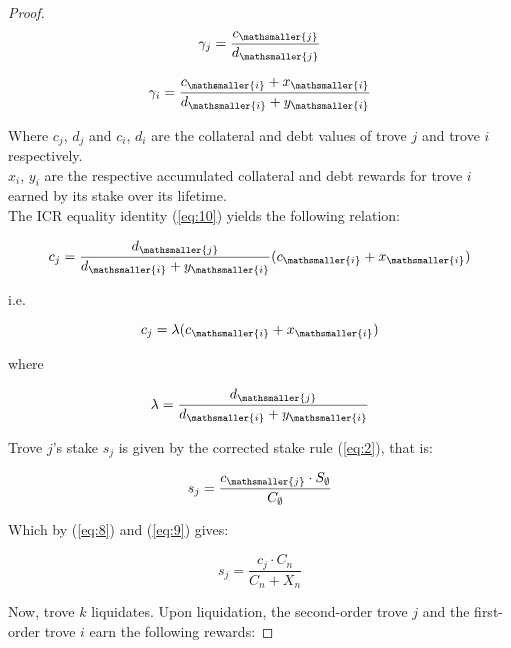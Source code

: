 \documentclass[reqno]{article}
\begin{document}
\begin{proof}
\begin{equation} 
    \gamma_j=\frac{c_\mathsmaller{j}}{d_\mathsmaller{j}}
\end{equation}

\begin{equation} 
    \gamma_i=\frac{c_\mathsmaller{i}+x_\mathsmaller{i}}{d_\mathsmaller{i}+y_\mathsmaller{i}}
\end{equation}

\bigskip
Where $c_j$, $d_j$ and $c_i$, $d_i$ are the collateral and debt values of trove $j$ and trove $i$ respectively.\\

$x_i$, $y_i$ are the respective accumulated collateral and debt rewards for trove $i$ earned by its stake over its lifetime.\\

The ICR equality identity (\ref{eq:10}) yields the following relation:

\begin{equation} 
        c_j=\frac{d_\mathsmaller{j}}{d_\mathsmaller{i}+y_\mathsmaller{i}}(c_\mathsmaller{i}+x_\mathsmaller{i})
\end{equation}

\bigskip
i.e.

\begin{equation} \label{eq:14}
    c_j=\lambda(c_\mathsmaller{i}+x_\mathsmaller{i})
\end{equation}

\bigskip
where

\begin{equation} \label{eq:15}
    \lambda=\frac{d_\mathsmaller{j}}{d_\mathsmaller{i}+y_\mathsmaller{i}}
\end{equation}


\bigskip
Trove $j$’s stake $s_j$ is given by the corrected stake rule (\ref{eq:2}), that is:

\begin{equation} 
    s_j=\frac{c_\mathsmaller{j} \cdot S_\emptyset}{C_\emptyset}
\end{equation}

\bigskip
Which by (\ref{eq:8}) and (\ref{eq:9}) gives:

\begin{equation} \label{eq:17}
    s_j=\frac{c_j \cdot C_n}{C_n+X_n}
\end{equation}

\bigskip
Now, trove $k$ liquidates. Upon liquidation, the second-order trove $j$ and the first-order trove $i$ earn the following rewards:


\end{proof}
\end{document}
